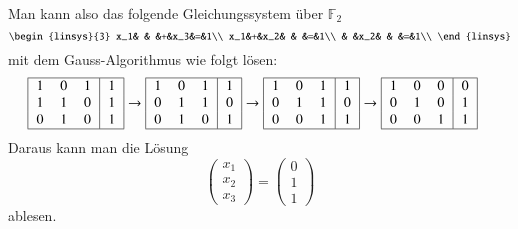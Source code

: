 Man kann also das folgende Gleichungssystem über $\mathbb F_2$
\begin{equation}
\begin{linsys}{3}
x_1& &   &+&x_3&=&1\\
x_1&+&x_2& &   &=&1\\
   & &x_2& &   &=&1\\
\end{linsys}
\label{ffield:gleichung}
\end{equation}
mit dem Gauss-Algorithmus wie folgt lösen:
\begin{align*}
\begin{tabular}{|>{$}c<{$}>{$}c<{$}>{$}c<{$}|>{$}c<{$}|}
\hline
1&0&1&1\\
1&1&0&1\\
0&1&0&1\\
\hline
\end{tabular}
&
\rightarrow
\begin{tabular}{|>{$}c<{$}>{$}c<{$}>{$}c<{$}|>{$}c<{$}|}
\hline
1&0&1&1\\
0&1&1&0\\
0&1&0&1\\
\hline
\end{tabular}
\rightarrow
\begin{tabular}{|>{$}c<{$}>{$}c<{$}>{$}c<{$}|>{$}c<{$}|}
\hline
1&0&1&1\\
0&1&1&0\\
0&0&1&1\\
\hline
\end{tabular}
\rightarrow
\begin{tabular}{|>{$}c<{$}>{$}c<{$}>{$}c<{$}|>{$}c<{$}|}
\hline
1&0&0&0\\
0&1&0&1\\
0&0&1&1\\
\hline
\end{tabular}
\end{align*}
Daraus kann man die Lösung
\[
\begin{pmatrix}x_1\\x_2\\x_3\end{pmatrix}
=
\begin{pmatrix}0\\1\\1\end{pmatrix}
\]
ablesen.

